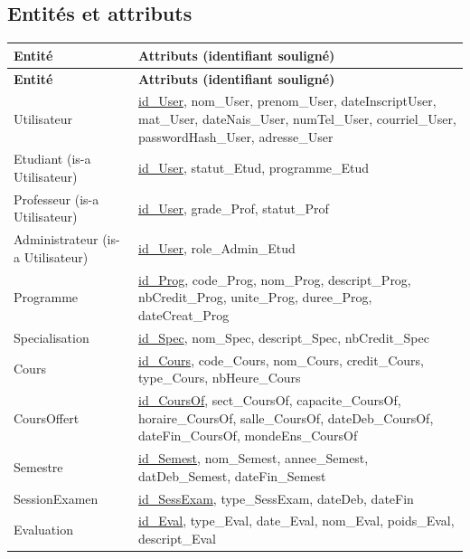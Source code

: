\documentclass[11pt,a4paper]{article}
\begin{document}
\subsection{Entités et attributs}

\begin{longtable}{@{}p{3.4cm} p{11.8cm}@{}}
\toprule
\textbf{Entité} & \textbf{Attributs (identifiant souligné)} \\
\midrule
\endfirsthead
\toprule
\textbf{Entité} & \textbf{Attributs (identifiant souligné)} \\
\midrule
\endhead

Utilisateur &
    \underline{id\_User}, nom\_User, prenom\_User, dateInscriptUser,
    mat\_User, dateNais\_User, numTel\_User, courriel\_User,
    passwordHash\_User, adresse\_User \\

Etudiant (is-a Utilisateur) &
    \underline{id\_User}, statut\_Etud, programme\_Etud \\

Professeur (is-a Utilisateur) &
    \underline{id\_User}, grade\_Prof, statut\_Prof \\

Administrateur (is-a Utilisateur) &
    \underline{id\_User}, role\_Admin\_Etud \\

Programme &
    \underline{id\_Prog}, code\_Prog, nom\_Prog, descript\_Prog,
    nbCredit\_Prog, unite\_Prog, duree\_Prog, dateCreat\_Prog \\

Specialisation &
    \underline{id\_Spec}, nom\_Spec, descript\_Spec, nbCredit\_Spec \\

Cours &
    \underline{id\_Cours}, code\_Cours, nom\_Cours, credit\_Cours,
    type\_Cours, nbHeure\_Cours \\

CoursOffert &
    \underline{id\_CoursOf}, sect\_CoursOf, capacite\_CoursOf,
    horaire\_CoursOf, salle\_CoursOf, dateDeb\_CoursOf, dateFin\_CoursOf,
    mondeEns\_CoursOf \\

Semestre &
    \underline{id\_Semest}, nom\_Semest, annee\_Semest,
    datDeb\_Semest, dateFin\_Semest \\

SessionExamen &
    \underline{id\_SessExam}, type\_SessExam, dateDeb, dateFin \\

Evaluation &
    \underline{id\_Eval}, type\_Eval, date\_Eval, nom\_Eval,
    poids\_Eval, descript\_Eval \\


\end{longtable}
\end{document}

